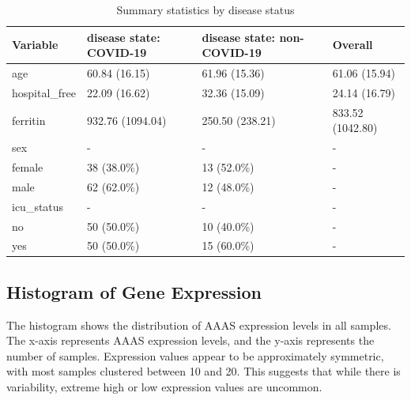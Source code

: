 \documentclass{article}
\begin{document}
\begin{table}[H]
\centering
\caption{\label{tab:summary}Summary statistics by disease status}
\begin{tabular}{llll}
\hline
{\color[HTML]{222222} Variable} &
  {\color[HTML]{222222} disease state: COVID-19} &
  {\color[HTML]{222222} disease state: non-COVID-19} &
  {\color[HTML]{222222} Overall} \\ \hline
{\color[HTML]{222222} age} &
  {\color[HTML]{222222} 60.84 (16.15)} &
  {\color[HTML]{222222} 61.96 (15.36)} &
  {\color[HTML]{222222} 61.06 (15.94)} \\
{\color[HTML]{222222} hospital\_free} &
  {\color[HTML]{222222} 22.09 (16.62)} &
  {\color[HTML]{222222} 32.36 (15.09)} &
  {\color[HTML]{222222} 24.14 (16.79)} \\
{\color[HTML]{222222} ferritin} &
  {\color[HTML]{222222} 932.76 (1094.04)} &
  {\color[HTML]{222222} 250.50 (238.21)} &
  {\color[HTML]{222222} 833.52 (1042.80)} \\
{\color[HTML]{222222} sex}         & {\color[HTML]{222222} -}           & {\color[HTML]{222222} -}           & {\color[HTML]{222222} -} \\
{\color[HTML]{222222} female}      & {\color[HTML]{222222} 38 (38.0\%)} & {\color[HTML]{222222} 13 (52.0\%)} & {\color[HTML]{222222} -} \\
{\color[HTML]{222222} male}        & {\color[HTML]{222222} 62 (62.0\%)} & {\color[HTML]{222222} 12 (48.0\%)} & {\color[HTML]{222222} -} \\
{\color[HTML]{222222} icu\_status} & {\color[HTML]{222222} -}           & {\color[HTML]{222222} -}           & {\color[HTML]{222222} -} \\
{\color[HTML]{222222} no}          & {\color[HTML]{222222} 50 (50.0\%)} & {\color[HTML]{222222} 10 (40.0\%)} & {\color[HTML]{222222} -} \\
{\color[HTML]{222222} yes}         & {\color[HTML]{222222} 50 (50.0\%)} & {\color[HTML]{222222} 15 (60.0\%)} & {\color[HTML]{222222} -} \\ \hline
\end{tabular}
\end{table}

\subsection{Histogram of Gene Expression}

The histogram shows the distribution of AAAS expression levels in all samples. The x-axis represents AAAS expression levels, and the y-axis represents the number of samples. Expression values appear to be approximately symmetric, with most samples clustered between 10 and 20. This suggests that while there is variability, extreme high or low expression values are uncommon.
\end{document}

